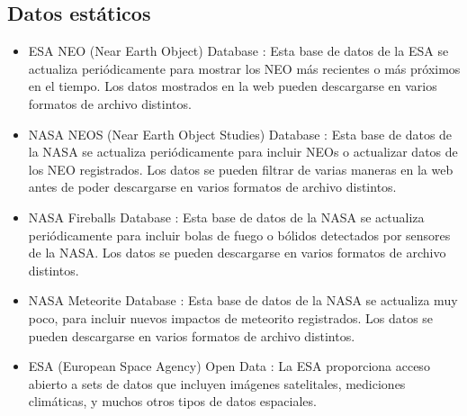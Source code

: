 \subsection*{Datos estáticos}
\begin{itemize}
  \item ESA NEO (Near Earth Object) Database \cite{esa-neo-db}: Esta base de datos de la ESA se actualiza periódicamente para mostrar los NEO más recientes o más próximos en el tiempo. Los datos mostrados en la web pueden descargarse en varios formatos de archivo distintos.
  \item NASA NEOS (Near Earth Object Studies) Database \cite{nasa-cneos-db}: Esta base de datos de la NASA se actualiza periódicamente para incluir NEOs o actualizar datos de los NEO registrados. Los datos se pueden filtrar de varias maneras en la web antes de poder descargarse en varios formatos de archivo distintos.
  \item NASA Fireballs Database \cite{nasa-fireballs-db}: Esta base de datos de la NASA se actualiza periódicamente para incluir bolas de fuego o bólidos detectados por sensores de la NASA. Los datos se pueden descargarse en varios formatos de archivo distintos.
  \item NASA Meteorite Database \cite{nasa-meteorite-db}: Esta base de datos de la NASA se actualiza muy poco, para incluir nuevos impactos de meteorito registrados. Los datos se pueden descargarse en varios formatos de archivo distintos.
  
  \item ESA (European Space Agency) Open Data \cite{esa-open-db}: La ESA proporciona acceso abierto a sets de datos que incluyen imágenes satelitales, mediciones climáticas, y muchos otros tipos de datos espaciales.
\end{itemize}



